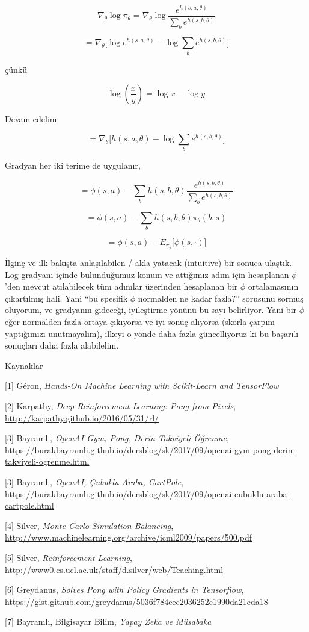 \documentclass[12pt,fleqn]{article}\usepackage{../../common}
\begin{document}
$$ 
\nabla_\theta \log \pi_\theta = 
\nabla_\theta \log \frac{e^{h(s,a,\theta)}}{\sum_b e^{h(s,b,\theta)} }
$$

$$ = \nabla_\theta \big[ \log e^{h(s,a,\theta)} - \log \sum_b e^{h(s,b,\theta)}\big]$$

çünkü 

$$ \log(\frac{x}{y}) = \log x - \log y $$

Devam edelim

$$ = \nabla_\theta \big[ h(s,a,\theta) - \log \sum_b e^{h(s,b,\theta)} \big]$$

Gradyan her iki terime de uygulanır,

$$ 
= \phi(s,a) - \sum_b h(s,b,\theta)\frac{e^{h(s,b,\theta)}}{\sum_b e^{h(s,b,\theta)}} 
$$

$$ 
= \phi(s,a) - \sum_b h(s,b,\theta) \pi_\theta(b,s)
$$

$$ 
= \phi(s,a) - E_{\pi_\theta} \big[ \phi(s,\cdot) \big]
$$

İlginç ve ilk bakışta anlaşılabilen / akla yatacak (intuitive) bir sonuca
ulaştık. Log gradyanı içinde bulunduğumuz konum ve attığımız adım için
hesaplanan $\phi$'den mevcut atılabilecek tüm adımlar üzerinden hesaplanan
bir $\phi$ ortalamasının çıkartılmış hali. Yani ``bu spesifik $\phi$
normalden ne kadar fazla?'' sorusunu sormuş oluyorum, ve gradyanın gideceği,
iyileştirme yönünü bu sayı belirliyor. Yani bir $\phi$ eğer normalden fazla
ortaya çıkıyorsa ve iyi sonuç alıyorsa (skorla çarpım yaptığımızı
unutmayalım), ilkeyi o yönde daha fazla güncelliyoruz ki bu başarılı
sonuçları daha fazla alabilelim.

Kaynaklar

[1] Géron, {\em Hands-On Machine Learning with Scikit-Learn and TensorFlow}

[2] Karpathy, {\em Deep Reinforcement Learning: Pong from Pixels}, 
    \url{http://karpathy.github.io/2016/05/31/rl/}

[3] Bayramlı, {\em OpenAI Gym, Pong, Derin Takviyeli Öğrenme},
    \url{https://burakbayramli.github.io/dersblog/sk/2017/09/openai-gym-pong-derin-takviyeli-ogrenme.html}

[3] Bayramlı, {\em OpenAI, Çubuklu Araba, CartPole},
   \url{https://burakbayramli.github.io/dersblog/sk/2017/09/openai-cubuklu-araba-cartpole.html}

[4] Silver, {\em Monte-Carlo Simulation Balancing},
    \url{http://www.machinelearning.org/archive/icml2009/papers/500.pdf}

[5] Silver, {\em Reinforcement Learning}, 
    \url{http://www0.cs.ucl.ac.uk/staff/d.silver/web/Teaching.html}

[6] Greydanus, {\em Solves Pong with Policy Gradients in Tensorflow}, 
    \url{https://gist.github.com/greydanus/5036f784eec2036252e1990da21eda18}

[7] Bayramlı, Bilgisayar Bilim, {\em Yapay Zeka ve Müsabaka}
\end{document}
